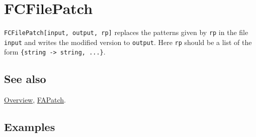 \documentclass[../FeynCalcManual.tex]{subfiles}
\begin{document}
\hypertarget{fcfilepatch}{
\section{FCFilePatch}\label{fcfilepatch}}

\texttt{FCFilePatch[\allowbreak{}input,\ \allowbreak{}output,\ \allowbreak{}rp]}
replaces the patterns given by \texttt{rp} in the file \texttt{input}
and writes the modified version to \texttt{output}. Here \texttt{rp}
should be a list of the form
\texttt{\{\allowbreak{}string -> string,\ \allowbreak{}...\}}.

\subsection{See also}

\hyperlink{toc}{Overview}, \hyperlink{fapatch}{FAPatch}.

\subsection{Examples}
\end{document}
